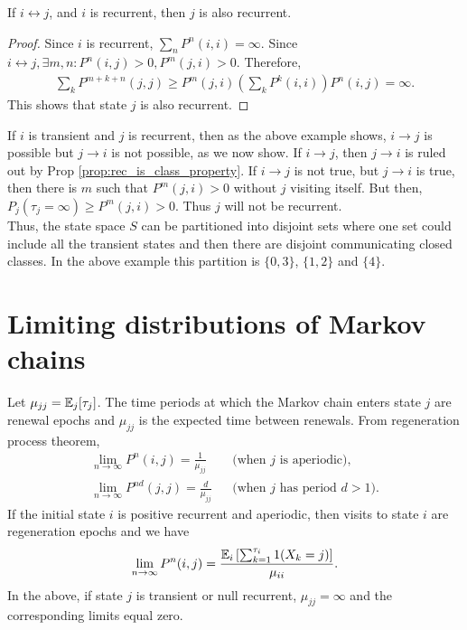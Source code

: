 \documentclass[all-lectures.tex]{subfiles}
\begin{document}
\begin{prop} \label{prop:rec_is_class_property}
If $i\leftrightarrow j$, and $i$ is recurrent, then $j$ is also recurrent.
\begin{proof}
Since $i$ is recurrent, $\sum_n P^n(i,i) = \infty$. Since $i\leftrightarrow j, \exists m,n : P^n(i,j) >0, P^m(j,i) >0$. Therefore,
\begin{align*}
\sum_k P^{m+k+n}(j,j) \geq  P^{m}(j,i) \left(\sum_k P^k(i,i)\right) P^{n}(i,j) = \infty.
\end{align*}
This shows that state $j$ is also recurrent.
\end{proof}
\end{prop}
If $i$ is transient and $j$ is recurrent, then as the above example shows, $i \rightarrow j$ is possible  but $j \rightarrow i$ is not possible, as we now show. If $i\rightarrow j$, then $j \rightarrow i$ is ruled out by Prop \ref{prop:rec_is_class_property}. If $i\rightarrow j$ is not true,  but $j \rightarrow i$ is true, then there is $m$ such that $P^m( j, i) >0$ without $j$ visiting itself. But then, $P_j(\tau_j= \infty) \geq P^m(j,i) >0$. Thus $j$ will not be recurrent. \\
\indent Thus, the state space $S$ can be partitioned into disjoint sets where one set could include all the transient states and then there are disjoint communicating closed classes. In the above example this partition is $\{0,3\}$, $\{1,2\}$ and  $\{4\}$.

\section{Limiting distributions of Markov chains}
Let $\mu_{jj} = \mathbb{E}_j[\tau_j]$. The time periods at which the Markov chain enters state $j$ are renewal epochs and $\mu_{jj}$ is the expected time between renewals. From regeneration process theorem,
\begin{align*}
\lim_{n\rightarrow \infty} P^n(i,j) = \frac{1}{\mu_{jj}} &&\text{(when $j$ is aperiodic)},\\
\lim_{n\rightarrow \infty} P^{nd}(j,j) = \frac{d}{\mu_{jj}} &&\text{(when $j$ has period $d> 1$).} 
\end{align*}
If the initial state $i$ is positive recurrent and aperiodic, then visits to state $i$ are regeneration epochs and we have 
\begin{align*}
\lim_{n\rightarrow \infty} P^n(i,j) = \frac{\mathbb{E}_i\left[\sum_{k=1}^{\tau_i} 1(X_k=j)\right]}{\mu_{ii}}.
\end{align*}
In the above, if state $j$ is transient or null recurrent, $\mu_{jj} = \infty$ and the corresponding limits equal zero. 
\end{document}
